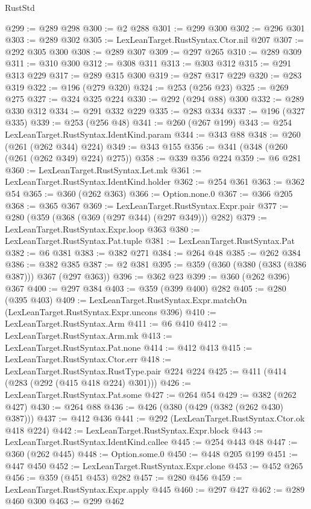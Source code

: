 \begin{lexlean}{RustStd}
\begin{coremodule}
{\begin{coremodule}
{{{{{{{{{{@299 := @289 @298
@300 := @2 @288
@301 := @299 @300
@302 := @296 @301
@303 := @289 @302
@305 := LexLeanTarget.RustSyntax.Ctor.nil @207
@307 := @292 @305 @300
@308 := @289 @307
@309 := @297 @265
@310 := @289 @309
@311 := @310 @300
@312 := @308 @311
@313 := @303 @312
@315 := @291 @313 @229
@317 := @289 @315 @300
@319 := @287 @317 @229
@320 := @283 @319
@322 := @196 (@279 @320)
@324 := @253 (@256 @23)
@325 := @269 @275
@327 := @324 @325 @224
@330 := @292 (@294 @88) @300
@332 := @289 @330 @312
@334 := @291 @332 @229
@335 := @283 @334
@337 := @196 (@327 @335)
@339 := @253 (@256 @48)
@341 := @260 (@267 @199)
@343 := @254 LexLeanTarget.RustSyntax.IdentKind.param
@344 := @343 @88
@348 := @260 (@261 (@262 @344) @224)
@349 := @343 @155
@356 := @341 (@348 (@260 (@261 (@262 @349) @224) @275))
@358 := @339 @356 @224
@359 := @6 @281
@360 := LexLeanTarget.RustSyntax.Let.mk
@361 := LexLeanTarget.RustSyntax.IdentKind.holder
@362 := @254 @361
@363 := @362 @54
@365 := @360 (@262 @363)
@366 := Option.none.{0}
@367 := @366 @205
@368 := @365 @367
@369 := LexLeanTarget.RustSyntax.Expr.pair
@377 := @280 (@359 (@368 (@369 (@297 @344) (@297 @349))) @282)
@379 := LexLeanTarget.RustSyntax.Expr.loop @363
@380 := LexLeanTarget.RustSyntax.Pat.tuple
@381 := LexLeanTarget.RustSyntax.Pat
@382 := @6 @381
@383 := @382 @271
@384 := @264 @48
@385 := @262 @384
@386 := @382 @385
@387 := @2 @381
@395 := @359 (@360 (@380 (@383 (@386 @387))) @367 (@297 @363))
@396 := @362 @23
@399 := @360 (@262 @396) @367
@400 := @297 @384
@403 := @359 (@399 @400) @282
@405 := @280 (@395 @403)
@409 := LexLeanTarget.RustSyntax.Expr.matchOn (LexLeanTarget.RustSyntax.Expr.uncons @396)
@410 := LexLeanTarget.RustSyntax.Arm
@411 := @6 @410
@412 := LexLeanTarget.RustSyntax.Arm.mk
@413 := LexLeanTarget.RustSyntax.Pat.none
@414 := @412 @413
@415 := LexLeanTarget.RustSyntax.Ctor.err
@418 := LexLeanTarget.RustSyntax.RustType.pair @224 @224
@425 := @411 (@414 (@283 (@292 (@415 @418 @224) @301)))
@426 := LexLeanTarget.RustSyntax.Pat.some
@427 := @264 @54
@429 := @382 (@262 @427)
@430 := @264 @88
@436 := @426 (@380 (@429 (@382 (@262 @430) @387)))
@437 := @412 @436
@441 := @292 (LexLeanTarget.RustSyntax.Ctor.ok @418 @224)
@442 := LexLeanTarget.RustSyntax.Expr.block
@443 := LexLeanTarget.RustSyntax.IdentKind.callee
@445 := @254 @443 @48
@447 := @360 (@262 @445)
@448 := Option.some.{0}
@450 := @448 @205 @199
@451 := @447 @450
@452 := LexLeanTarget.RustSyntax.Expr.clone
@453 := @452 @265
@456 := @359 (@451 @453) @282
@457 := @280 @456
@459 := LexLeanTarget.RustSyntax.Expr.apply @445
@460 := @297 @427
@462 := @289 @460 @300
@463 := @299 @462
}}}}}}}}}}
\end{coremodule}}
\end{coremodule}
\end{lexlean}
